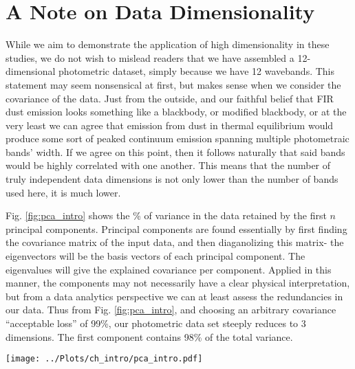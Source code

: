 \chapter*{A Note on Data Dimensionality}

While we aim to demonstrate the application of high dimensionality in these studies, we do not wish to mislead readers that we have assembled a 12-dimensional photometric dataset, simply because we have 12 wavebands. This statement may seem nonsensical at first, but makes sense when we consider the covariance of the data. Just from the outside, and our faithful belief that FIR dust emission looks something like a blackbody, or modified blackbody, or at the very least we can agree that emission from dust in thermal equilibrium would produce some sort of peaked continuum emission spanning multiple photometraic bands' width. If we agree on this point, then it follows naturally that said bands would be highly correlated with one another. This means that the number of truly independent data dimensions is not only lower than the number of bands used here, it is much lower.

Fig. \hyperref[fig:pca_intro]{\ref{fig:pca_intro}} shows the \% of variance in the data retained by the first $n$ principal components. Principal components are found essentially by first finding the covariance matrix of the input data, and then diaganolizing this matrix- the eigenvectors will be the basis vectors of each principal component. The eigenvalues will give the explained covariance per component. Applied in this manner, the components may not necessarily have a clear physical interpretation, but from a data analytics perspective we can at least assess the redundancies in our data. Thus from Fig. \hyperref[fig:pca_intro]{\ref{fig:pca_intro}}, and choosing an arbitrary covariance ``acceptable loss'' of 99\%, our photometric data set steeply reduces to 3 dimensions. The first component contains 98\% of the total variance.


\begin{figure*}
  \label{fig:pca_intro}
  \texttt{[image: ../Plots/ch\_intro/pca\_intro.pdf]}
  \centering
  \caption{Explained variance decline for principal component analysis performed on a set of 12 all-sky infrared maps. The first three components account for over 99\% of the total variance. The PCA fit is performed on the whole sky, after whitening the data, using the ``scikitlearn }
\end{figure*}
